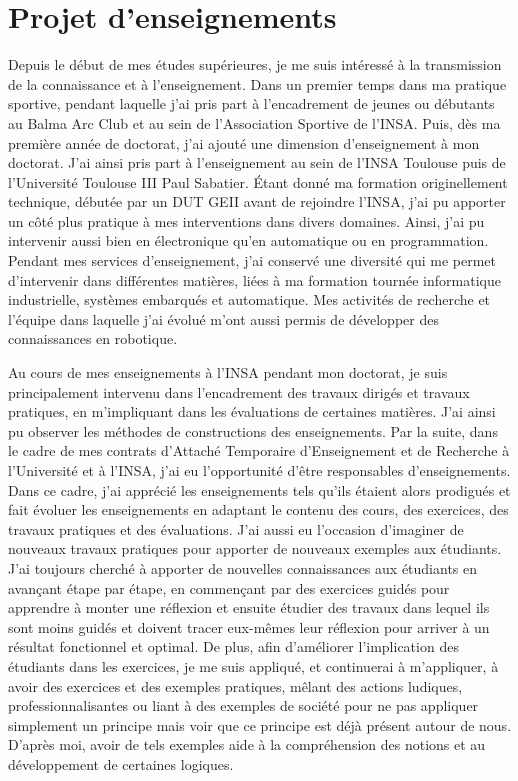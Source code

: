 \section{Projet d'enseignements}\label{projet-enseignement} %

Depuis le début de mes études supérieures, je me suis intéressé à la transmission de la connaissance et à l'enseignement. Dans un premier temps dans ma pratique sportive, pendant laquelle j'ai pris part à l'encadrement de jeunes ou débutants au Balma Arc Club et au sein de l'Association Sportive de l'INSA. Puis, dès ma première année de doctorat, j'ai ajouté une dimension d'enseignement à mon doctorat. J'ai ainsi pris part à l'enseignement au sein de l'INSA Toulouse puis de l'Université Toulouse III Paul Sabatier. Étant donné ma formation originellement technique, débutée par un DUT GEII avant de rejoindre l'INSA, j'ai pu apporter un côté plus pratique à mes interventions dans divers domaines. Ainsi, j'ai pu intervenir aussi bien en électronique qu'en automatique ou en programmation. Pendant mes services d'enseignement, j'ai conservé une diversité qui me permet d'intervenir dans différentes matières, liées à ma formation tournée informatique industrielle, systèmes embarqués et automatique. Mes activités de recherche et l'équipe dans laquelle j'ai évolué m'ont aussi permis de développer des connaissances en robotique.

Au cours de mes enseignements à l'INSA pendant mon doctorat, je suis principalement intervenu dans l'encadrement des travaux dirigés et travaux pratiques, en m'impliquant dans les évaluations de certaines matières. J'ai ainsi pu observer les méthodes de constructions des enseignements. Par la suite, dans le cadre de mes contrats d'Attaché Temporaire d'Enseignement et de Recherche à l'Université et à l'INSA, j'ai eu l'opportunité d'être responsables d'enseignements. Dans ce cadre, j'ai apprécié les enseignements tels qu'ils étaient alors prodigués et fait évoluer les enseignements en adaptant le contenu des cours, des exercices, des travaux pratiques et des évaluations. J'ai aussi eu l'occasion d'imaginer de nouveaux travaux pratiques pour apporter de nouveaux exemples aux étudiants. J'ai toujours cherché à apporter de nouvelles connaissances aux étudiants en avançant étape par étape, en commençant par des exercices guidés pour apprendre à monter une réflexion et ensuite étudier des travaux dans lequel ils sont moins guidés et doivent tracer eux-mêmes leur réflexion pour arriver à un résultat fonctionnel et optimal. De plus, afin d'améliorer l'implication des étudiants dans les exercices, je me suis appliqué, et continuerai à m'appliquer, à avoir des exercices et des exemples pratiques, mêlant des actions ludiques, professionnalisantes ou liant à des exemples de société pour ne pas appliquer simplement un principe mais voir que ce principe est déjà présent autour de nous. D'après moi, avoir de tels exemples aide à la compréhension des notions et au développement de certaines logiques.

